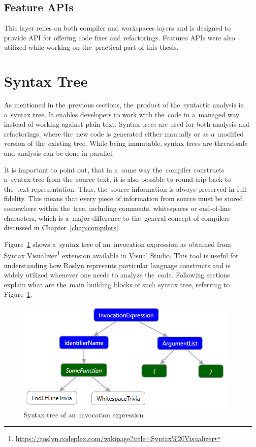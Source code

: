 \documentclass[
  digital, %
  table,   %
  lof,     %
  lot,     %
  oneside,
]{fithesis3}
\begin{document}
\subsection{Feature APIs}
This layer relies on both compiler and workspaces layers and is designed to provide API for offering code fixes and refactorings. Features APIs were also utilized while working on the~practical part of this thesis.
  
\section{Syntax Tree}
As mentioned in the~previous sections, the~product of the~syntactic analysis is a~syntax tree. It enables developers to work with the~code in a~managed way instead of working against plain text. Syntax trees are used for both analysis and refactorings, where the~new code is generated either manually or as a~modified version of the~existing tree. While being immutable, syntax trees are thread-safe and analysis can be done in parallel.

It is important to point out, that in a~same way the~compiler constructs a~syntax tree from the~source text, it is also possible to round-trip back to the~text representation. Thus, the~source information is always preserved in full fidelity. This means that every piece of information from source must be stored somewhere within the~tree, including comments, whitespaces or end-of-line characters, which is a~major difference to the~general concept of compilers discussed in Chapter~\ref{chap:compilers}.

Figure~\ref{fig:roslyn-syntax-tree} shows a~syntax tree of an~invocation expression as obtained from Syntax Visualizer\footnote{\url{https://roslyn.codeplex.com/wikipage?title=Syntax\%20Visualizer}} extension available in Visual Studio. This tool is useful for understanding how Roslyn represents particular language constructs and is widely utilized whenever one needs to analyze the~code. Following sections explain what are the~main building blocks of such syntax tree, referring to Figure~\ref{fig:roslyn-syntax-tree}.

\begin{figure}[h!]
		\centering
			\includegraphics[scale=0.8]{img/roslyn-syntax-tree-2}
		\caption{Syntax tree of an~invocation expression}
		\label{fig:roslyn-syntax-tree}
\end{figure}
\end{document}
